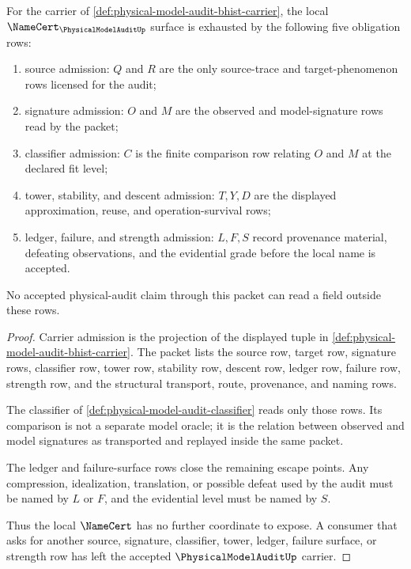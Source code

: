 \begin{theorem}
\label{thm:physical-model-audit-namecert-obligation-surface}
For the carrier of \autoref{def:physical-model-audit-bhist-carrier}, the local $\NameCert_{\PhysicalModelAuditUp}$ surface is exhausted by the following five obligation rows:
\begin{enumerate}
\item source admission: $Q$ and $R$ are the only source-trace and target-phenomenon rows licensed for the audit;
\item signature admission: $O$ and $M$ are the observed and model-signature rows read by the packet;
\item classifier admission: $C$ is the finite comparison row relating $O$ and $M$ at the declared fit level;
\item tower, stability, and descent admission: $T,Y,D$ are the displayed approximation, reuse, and operation-survival rows;
\item ledger, failure, and strength admission: $L,F,S$ record provenance material, defeating observations, and the evidential grade before the local name is accepted.
\end{enumerate}
No accepted physical-audit claim through this packet can read a field outside these rows.
\end{theorem}
\begin{proof}
Carrier admission is the projection of the displayed tuple in \autoref{def:physical-model-audit-bhist-carrier}. The packet lists the source row, target row, signature rows, classifier row, tower row, stability row, descent row, ledger row, failure row, strength row, and the structural transport, route, provenance, and naming rows.

The classifier of \autoref{def:physical-model-audit-classifier} reads only those rows. Its comparison is not a separate model oracle; it is the relation between observed and model signatures as transported and replayed inside the same packet.

The ledger and failure-surface rows close the remaining escape points. Any compression, idealization, translation, or possible defeat used by the audit must be named by $L$ or $F$, and the evidential level must be named by $S$.

Thus the local $\NameCert$ has no further coordinate to expose. A consumer that asks for another source, signature, classifier, tower, ledger, failure surface, or strength row has left the accepted $\PhysicalModelAuditUp$ carrier.
\end{proof}

